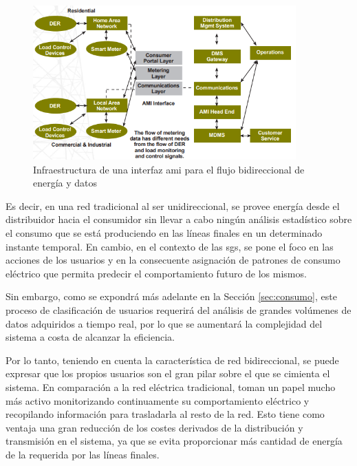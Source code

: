 \vspace{3mm}

\begin{figure}[h!]
  \centering
  \includegraphics[width=0.9\textwidth]{img/teoria/bidir.png}
  \caption{Infraestructura de una interfaz \acrshort{ami} para el flujo bidireccional de energía y datos \cite{us}}
  \label{fig:bidireccional2}
\end{figure}

Es decir, en una red tradicional al ser unidireccional, se provee energía desde el distribuidor hacia el consumidor sin llevar a cabo ningún análisis estadístico sobre el consumo que se está produciendo en las líneas finales en un determinado instante temporal. En cambio, en el contexto de las \gls{sg}s, se pone el foco en las acciones de los usuarios y en la consecuente asignación de patrones de consumo eléctrico que permita predecir el comportamiento futuro de los mismos. \cite{convencional}

\vspace{3mm}

Sin embargo, como se expondrá más adelante en la Sección \ref{sec:consumo}, este proceso de clasificación de usuarios requerirá del análisis de grandes volúmenes de datos adquiridos a tiempo real, por lo que se aumentará la complejidad del sistema a costa de alcanzar la eficiencia.

\vspace{3mm}

Por lo tanto, teniendo en cuenta la característica de red bidireccional, se puede expresar que los propios usuarios son el gran pilar sobre el que se cimienta el sistema. En comparación a la red eléctrica tradicional, toman un papel mucho más activo monitorizando continuamente su comportamiento eléctrico y recopilando información para trasladarla al resto de la red. Esto tiene como ventaja una gran reducción de los costes derivados de la distribución y transmisión en el sistema, ya que se evita proporcionar más cantidad de energía de la requerida por las líneas finales. \cite{iotfutura}

